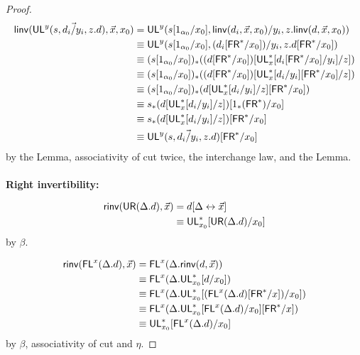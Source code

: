 \begin{proof}
\begin{align*}
\mathsf{linv}(\mathsf{UL}^{y}_{}(s,\vec{d_i/y_i},z.d),\vec{x},x_0) 
&= \mathsf{UL}^{y}_{}(s[1_{\alpha_0}/x_0],\mathsf{linv}(d_i,\vec{x},x_0)/y_i,z.\mathsf{linv}(d,\vec{x},x_0)) \\
&\equiv \mathsf{UL}^{y}_{}(s[1_{\alpha_0}/x_0],(d_i[\mathsf{FR}^*/x_0])/y_i,z.d[\mathsf{FR}^*/x_0]) \\
&\equiv (s[1_{\alpha_0}/x_0])_*((d[\mathsf{FR}^*/x_0])[\mathsf{UL}^*_{x}[d_i[\mathsf{FR}^*/x_0]/y_i]/z]) \\
&\equiv (s[1_{\alpha_0}/x_0])_*((d[\mathsf{FR}^*/x_0])[\mathsf{UL}^*_{x}[d_i/y_i][\mathsf{FR}^*/x_0]/z]) \\
&\equiv (s[1_{\alpha_0}/x_0])_*(d[\mathsf{UL}^*_{x}[d_i/y_i]/z][\mathsf{FR}^*/x_0]) \\
&\equiv s_*(d[\mathsf{UL}^*_{x}[d_i/y_i]/z])[1_*(\mathsf{FR}^*)/x_0] \\
&\equiv s_*(d[\mathsf{UL}^*_{x}[d_i/y_i]/z])[\mathsf{FR}^*/x_0] \\
&\equiv \mathsf{UL}^{y}_{}(s,\vec{d_i/y_i},z.d)[\mathsf{FR}^*/x_0]
\end{align*}
by the Lemma, associativity of cut twice, the interchange law, and the Lemma.
\\~\\
\textbf{Right invertibility:}

\begin{align*}
\mathsf{rinv}(\mathsf{UR}(\Delta.d),\vec{x}) &= d[\Delta \leftrightarrow \vec{x}]\\
&\equiv \mathsf{UL}^*_{x_0}[\mathsf{UR}(\Delta.d)/x_0]
\end{align*}
by $\beta$.

\begin{align*}
\mathsf{rinv}(\mathsf{FL}^{x}(\Delta.d),\vec{x}) 
&= \mathsf{FL}^{x}(\Delta.\mathsf{rinv}(d,\vec{x})) \\
&\equiv \mathsf{FL}^{x}(\Delta.\mathsf{UL}^*_{x_0}[d/x_0]) \\
&\equiv \mathsf{FL}^{x}(\Delta.\mathsf{UL}^*_{x_0}[(\mathsf{FL}^{x}(\Delta.d)[\mathsf{FR}^*/x])/x_0]) \\
&\equiv \mathsf{FL}^{x}(\Delta.\mathsf{UL}^*_{x_0}[\mathsf{FL}^{x}(\Delta.d)/x_0][\mathsf{FR}^*/x]) \\
&\equiv \mathsf{UL}^*_{x_0}[\mathsf{FL}^{x}(\Delta.d)/x_0]
\end{align*}
by $\beta$, associativity of cut and $\eta$.


\end{proof}
